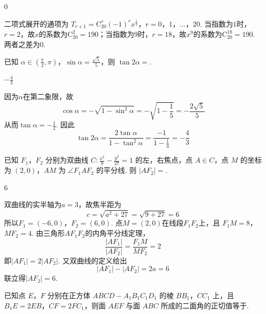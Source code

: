 \begin{answer}
0
\end{answer}

\begin{solution}
二项式展开的通项为
\(T_{r+1}=\mathrm C_{20}^{r}(-1)^r x^{\frac{r}{2}}\)，\(r=0\)，\(1\)，\(\ldots\)，\(20\).
当指数为\(1\)时，\(r=2\)，故\(x\)的系数为\(\mathrm C_{20}^{2}=190\)；当指数为\(9\)时，\(r=18\)，故\(x^9\)的系数为\(\mathrm C_{20}^{18}=190\). 两者之差为\(0\).
\end{solution}


\begin{problem}
已知 \(\alpha \in \left(\frac{\pi}{2}, \pi\right)\)，\(\sin \alpha = \frac{\sqrt{5}}{5}\)，则 \(\tan 2\alpha = \)\fillinblank{}.
\end{problem}

\begin{answer}
\(-\frac{4}{3}\)
\end{answer}

\begin{solution}
因为\(\alpha\)在第二象限，故
\[
\cos\alpha=-\sqrt{1-\sin^2\alpha}=-\sqrt{1-\frac15}=-\frac{2\sqrt5}{5}
\]
从而\(\tan\alpha=-\frac12\). 因此
\[
\tan2\alpha=\frac{2\tan\alpha}{1-\tan^2\alpha}
=\frac{-1}{1-\frac14}=-\frac43
\]
\end{solution}


\begin{problem}
已知 \(F_{1}\)，\(F_{2}\) 分别为双曲线 \(C: \frac{x^{2}}{9} - \frac{y^{2}}{27} = 1\) 的左，右焦点，点 \(A \in C\)，点 \(M\) 的坐标为 \((2,0)\)，\(AM\) 为 \(\angle F_{1}AF_{2}\) 的平分线. 则 \(|AF_{2}| = \)\fillinblank{}.
\end{problem}

\begin{answer}
6
\end{answer}

\begin{solution}
双曲线的实半轴为\(a=3\)，故焦半距为
\[
c=\sqrt{a^2+27}=\sqrt{9+27}=6
\]
所以\(F_1=(-6,0)\)，\(F_2=(6,0)\). 点\(M=(2,0)\)在线段\(F_1F_2\)上，且
\(F_1M=8\)，\(MF_2=4\).
由三角形\(AF_1F_2\)的内角平分线定理，
\[
\frac{|AF_1|}{|AF_2|}=\frac{F_1M}{MF_2}=2
\]
即\(|AF_1|=2|AF_2|\). 又双曲线的定义给出
\[
|AF_1|-|AF_2|=2a=6
\]
联立得\(|AF_2|=6\).
\end{solution}


\begin{problem}
已知点 \(E\)，\(F\) 分别在正方体 \(ABCD - A_{1}B_{1}C_{1}D_{1}\) 的棱 \(BB_{1}\)，\(CC_{1}\) 上，且 \(B_{1}E = 2EB\)，\(CF = 2FC_{1}\)，则面 \(AEF\) 与面 \(ABC\) 所成的二面角的正切值等于\fillinblank{}.
\end{problem}

